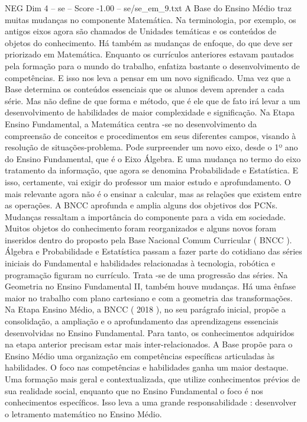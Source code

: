 \begin{textsample}{NEG Dim 4 – se – Score -1.00 – se/se\_em\_9.txt}
A Base do Ensino Médio traz muitas mudanças no componente Matemática.
Na terminologia, por exemplo, os antigos eixos agora são chamados de Unidades temáticas e os conteúdos de objetos do conhecimento.
Há também as mudanças de enfoque, do que deve ser priorizado em Matemática.
Enquanto os currículos anteriores estavam pautados pela formação para o mundo do trabalho, enfatiza bastante o desenvolvimento de competências.
E isso nos leva a pensar em um novo significado.
Uma vez que a Base determina os conteúdos essenciais que os alunos devem aprender a cada série.
Mas não define de que forma e método, que é ele que de fato irá levar a um desenvolvimento de habilidades de maior complexidade e significação.
Na Etapa Ensino Fundamental, a Matemática centra -se no desenvolvimento da compreensão de conceitos e procedimentos em seus diferentes campos, visando à resolução de situações-problema.
Pode surpreender um novo eixo, desde o 1º ano do Ensino Fundamental, que é o Eixo Álgebra.
E uma mudança no termo do eixo tratamento da informação, que agora se denomina Probabilidade e Estatística.
E isso, certamente, vai exigir do professor um maior estudo e aprofundamento.
O mais relevante agora não é o ensinar a calcular, mas as relações que existem entre as operações.
A BNCC aprofunda e amplia alguns dos objetivos dos PCNs.
Mudanças ressaltam a importância do componente para a vida em sociedade.
Muitos objetos do conhecimento foram reorganizados e alguns novos foram inseridos dentro do proposto pela Base Nacional Comum Curricular ( BNCC ).
Álgebra e Probabilidade e Estatística passam a fazer parte do cotidiano das séries iniciais do Fundamental e habilidades relacionadas à tecnologia, robótica e programação figuram no currículo.
Trata -se de uma progressão das séries.
Na Geometria no Ensino Fundamental II, também houve mudanças.
Há uma ênfase maior no trabalho com plano cartesiano e com a geometria das transformações.
Na Etapa Ensino Médio, a BNCC ( 2018 ), no seu parágrafo inicial, propõe a consolidação, a ampliação e o aprofundamento das aprendizagens essenciais desenvolvidas no Ensino Fundamental.
Para tanto, os conhecimentos adquiridos na etapa anterior precisam estar mais inter-relacionados.
A Base propõe para o Ensino Médio uma organização em competências específicas articuladas às habilidades.
O foco nas competências e habilidades ganha um maior destaque.
Uma formação mais geral e contextualizada, que utilize conhecimentos prévios de sua realidade social, enquanto que no Ensino Fundamental o foco é nos conhecimentos específicos.
Isso leva a uma grande responsabilidade : desenvolver o letramento matemático no Ensino Médio.

\end{textsample}
